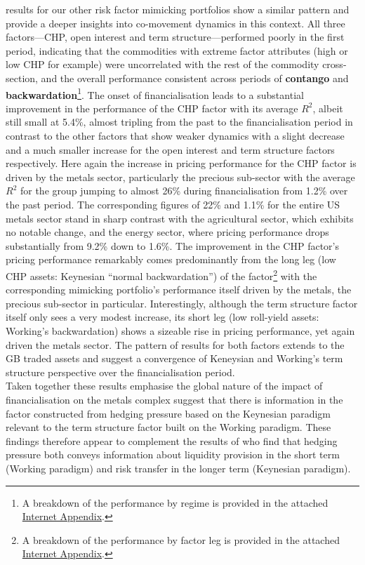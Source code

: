 \documentclass[
  authoryear,
  preprint,
  3p]{elsarticle}
\begin{document}
results for our other risk factor mimicking portfolios show a similar
pattern and provide a deeper insights into co-movement dynamics in this
context. All three factors---CHP, open interest and term
structure---performed poorly in the first period, indicating that the
commodities with extreme factor attributes (high or low CHP for example)
were uncorrelated with the rest of the commodity cross-section, and the
overall performance consistent across periods of \textbf{contango} and
\textbf{backwardation}\footnote{A breakdown of the performance by regime
  is provided in the attached
  \href{http://bautheac.duckdns.org:3838/bautheac/co-movement/}{Internet
  Appendix}.}. The onset of financialisation leads to a substantial
improvement in the performance of the CHP factor with its average
\(R^{2}\), albeit still small at 5.4\%, almost tripling from the past to
the financialisation period in contrast to the other factors that show
weaker dynamics with a slight decrease and a much smaller increase for
the open interest and term structure factors respectively. Here again
the increase in pricing performance for the CHP factor is driven by the
metals sector, particularly the precious sub-sector with the average
\(R^{2}\) for the group jumping to almost 26\% during financialisation
from 1.2\% over the past period. The corresponding figures of 22\% and
1.1\% for the entire US metals sector stand in sharp contrast with the
agricultural sector, which exhibits no notable change, and the energy
sector, where pricing performance drops substantially from 9.2\% down to
1.6\%. The improvement in the CHP factor's pricing performance
remarkably comes predominantly from the long leg (low CHP assets:
Keynesian ``normal backwardation'') of the factor\footnote{A breakdown
  of the performance by factor leg is provided in the attached
  \href{http://bautheac.duckdns.org:3838/bautheac/co-movement/}{Internet
  Appendix}.} with the corresponding mimicking portfolio's performance
itself driven by the metals, the precious sub-sector in particular.
Interestingly, although the term structure factor itself only sees a
very modest increase, its short leg (low roll-yield assets: Working's
backwardation) shows a sizeable rise in pricing performance, yet again
driven the metals sector. The pattern of results for both factors
extends to the GB traded assets and suggest a convergence of Keneysian
and Working's term structure perspective over the financialisation
period.\\
Taken together these results emphasise the global nature of the impact
of financialisation on the metals complex suggest that there is
information in the factor constructed from hedging pressure based on the
Keynesian paradigm relevant to the term structure factor built on the
Working paradigm. These findings therefore appear to complement the
results of \citet{kang_tale_2020} who find that hedging pressure both
conveys information about liquidity provision in the short term (Working
paradigm) and risk transfer in the longer term (Keynesian paradigm).
\end{document}
